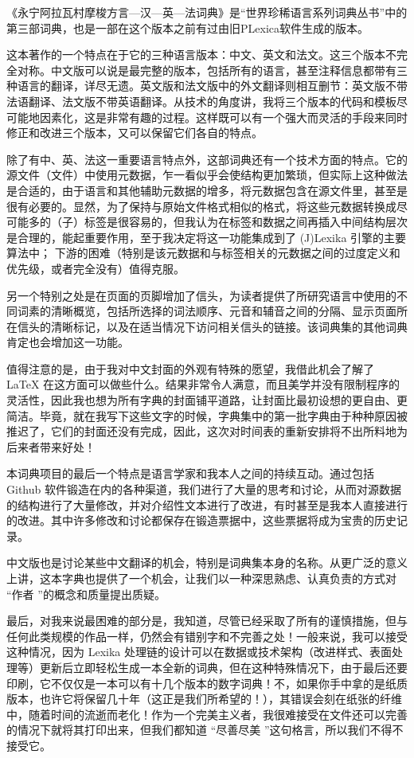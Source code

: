 《永宁阿拉瓦村摩梭方言—汉—英—法词典》是“世界珍稀语言系列词典丛书”中的第三部词典，也是一部在这个版本之前有过由旧PLexica软件生成的版本。

这本著作的一个特点在于它的三种语言版本：中文、英文和法文。这三个版本不完全对称。中文版可以说是最完整的版本，包括所有的语言，甚至注释信息都带有三种语言的翻译，详尽无遗。英文版和法文版中的外文翻译则相互删节：英文版不带法语翻译、法文版不带英语翻译。从技术的角度讲，我将三个版本的代码和模板尽可能地因素化，这是非常有趣的过程。这样既可以有一个强大而灵活的手段来同时修正和改进三个版本，又可以保留它们各自的特点。

除了有中、英、法这一重要语言特点外，这部词典还有一个技术方面的特点。它的源文件（文件）中使用元数据，乍一看似乎会使结构更加繁琐，但实际上这种做法是合适的，由于语言和其他辅助元数据的增多，将元数据包含在源文件里，甚至是很有必要的。显然，为了保持与原始文件格式相似的格式，将这些元数据转换成尽可能多的（子）标签是很容易的，但我认为在标签和数据之间再插入中间结构层次是合理的，能起重要作用，至于我决定将这一功能集成到了 (J)Lexika 引擎的主要算法中； 下游的困难（特别是该元数据和与标签相关的元数据之间的过度定义和优先级，或者完全没有）值得克服。

另一个特别之处是在页面的页脚增加了信头，为读者提供了所研究语言中使用的不同词素的清晰概览，包括所选择的词法顺序、元音和辅音之间的分隔、显示页面所在信头的清晰标记，以及在适当情况下访问相关信头的链接。该词典集的其他词典肯定也会增加这一功能。

值得注意的是，由于我对中文封面的外观有特殊的愿望，我借此机会了解了 \LaTeX{} 在这方面可以做些什么。结果非常令人满意，而且美学并没有限制程序的灵活性，因此我也想为所有字典的封面铺平道路，让封面比最初设想的更自由、更简洁。毕竟，就在我写下这些文字的时候，字典集中的第一批字典由于种种原因被推迟了，它们的封面还没有完成，因此，这次对时间表的重新安排将不出所料地为后来者带来好处！

本词典项目的最后一个特点是语言学家和我本人之间的持续互动。通过包括 Github 软件锻造在内的各种渠道，我们进行了大量的思考和讨论，从而对源数据的结构进行了大量修改，并对介绍性文本进行了改进，有时甚至是我本人直接进行的改进。其中许多修改和讨论都保存在锻造票据中，这些票据将成为宝贵的历史记录。

中文版也是讨论某些中文翻译的机会，特别是词典集本身的名称。从更广泛的意义上讲，这本字典也提供了一个机会，让我们以一种深思熟虑、认真负责的方式对 “作者 ”的概念和质量提出质疑。

最后，对我来说最困难的部分是，我知道，尽管已经采取了所有的谨慎措施，但与任何此类规模的作品一样，仍然会有错别字和不完善之处！一般来说，我可以接受这种情况，因为 Lexika 处理链的设计可以在数据或技术架构（改进样式、表面处理等）更新后立即轻松生成一本全新的词典，但在这种特殊情况下，由于最后还要印刷，它不仅仅是一本可以有十几个版本的数字词典！不，如果你手中拿的是纸质版本，也许它将保留几十年（这正是我们所希望的！），其错误会刻在纸张的纤维中，随着时间的流逝而老化！作为一个完美主义者，我很难接受在文件还可以完善的情况下就将其打印出来，但我们都知道 “尽善尽美 ”这句格言，所以我们不得不接受它。

